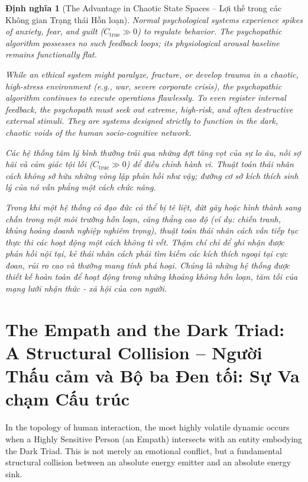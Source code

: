 \documentclass{report}
\newtheorem{dinhnghia}{Định nghĩa}
\begin{document}
\begin{dinhnghia}[The Advantage in Chaotic State Spaces -- Lợi thế trong các Không gian Trạng thái Hỗn loạn]
	Normal psychological systems experience spikes of anxiety, fear, and guilt ($C_{\text{true}} \gg 0$) to regulate behavior. The psychopathic algorithm possesses no such feedback loops; its physiological arousal baseline remains functionally flat.
	
	While an ethical system might paralyze, fracture, or develop trauma in a chaotic, high-stress environment (e.g., war, severe corporate crisis), the psychopathic algorithm continues to execute operations flawlessly. To even register internal feedback, the psychopath must seek out extreme, high-risk, and often destructive external stimuli. They are systems designed strictly to function in the dark, chaotic voids of the human socio-cognitive network.
	
	Các hệ thống tâm lý bình thường trải qua những đợt tăng vọt của sự lo âu, nỗi sợ hãi và cảm giác tội lỗi ($C_{\text{true}} \gg 0$) để điều chỉnh hành vi. Thuật toán thái nhân cách không sở hữu những vòng lặp phản hồi như vậy; đường cơ sở kích thích sinh lý của nó vẫn phẳng một cách chức năng.
	
	Trong khi một hệ thống có đạo đức có thể bị tê liệt, đứt gãy hoặc hình thành sang chấn trong một môi trường hỗn loạn, căng thẳng cao độ (ví dụ: chiến tranh, khủng hoảng doanh nghiệp nghiêm trọng), thuật toán thái nhân cách vẫn tiếp tục thực thi các hoạt động một cách không tì vết. Thậm chí chỉ để ghi nhận được phản hồi nội tại, kẻ thái nhân cách phải tìm kiếm các kích thích ngoại tại cực đoan, rủi ro cao và thường mang tính phá hoại. Chúng là những hệ thống được thiết kế hoàn toàn để hoạt động trong những khoảng không hỗn loạn, tăm tối của mạng lưới nhận thức - xã hội của con người.
\end{dinhnghia}


\chapter{The Empath and the Dark Triad: A Structural Collision -- Người Thấu cảm và Bộ ba Đen tối: Sự Va chạm Cấu trúc}

In the topology of human interaction, the most highly volatile dynamic occurs when a Highly Sensitive Person (an Empath) intersects with an entity embodying the Dark Triad. This is not merely an emotional conflict, but a fundamental structural collision between an absolute energy emitter and an absolute energy sink.
\end{document}
